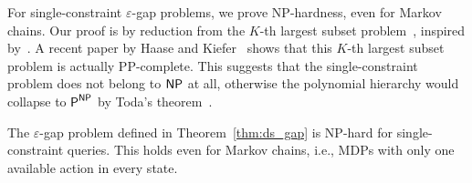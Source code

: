 \documentclass{llncs}
\newcommand\NPTIME{\textrm{\sf NP}}
\newcommand\PTIME{\textrm{\sf P}}
\begin{document}
For single-constraint $\varepsilon$-gap problems, we prove \NPTIME-hardness, even for Markov chains. Our proof is by reduction from the $K$-th largest subset problem~\cite{garey_FNY1979}, inspired by~\cite[Theorem 11]{DBLP:conf/stacs/BruyereFRR14}. A recent paper by Haase and Kiefer~\cite{HaasePP} shows that this $K$-th largest subset problem is actually \textsf{PP}-complete. This suggests that the single-constraint problem does not belong to $\NPTIME$ at all, otherwise the polynomial hierarchy would collapse to $\PTIME^{\NPTIME}$ by Toda's theorem~\cite{toda1991pp}.


\begin{lemma}
\label{lem:ds_np_hard}
The $\varepsilon$-gap problem defined in Theorem~\ref{thm:ds_gap} is \NPTIME-hard for single-constraint queries. This holds even for Markov chains, i.e., MDPs with only one available action in every state.
\end{lemma}
\end{document}
